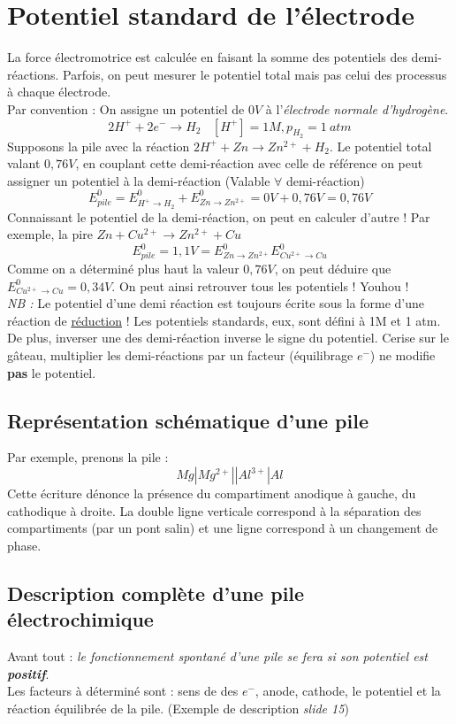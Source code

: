 \documentclass[british,french,11pt, a4paper, openany]{book}
\begin{document}
\section{Potentiel standard de l'électrode}
La force électromotrice est calculée en faisant la somme des potentiels des demi-réactions. Parfois, on peut mesurer le potentiel total mais pas celui des processus à chaque électrode.\\
Par convention  : On assigne un potentiel de $0 V$ à l'\textit{électrode normale d'hydrogène}.
$$2H^+ + 2e^- \rightarrow H_2\ \ \ \ [H^+] = 1M, p_{H_2} = 1\ atm$$
Supposons la pile avec la réaction $2H^+ + Zn \rightarrow Zn^{2+} + H_2$. Le potentiel total valant $0,76V$, en couplant cette demi-réaction avec celle de référence on peut assigner un potentiel à la demi-réaction (Valable $\forall$ demi-réaction)
$$E^0_{pile} = E^0_{H^+ \rightarrow H_2} + E^0_{Zn \rightarrow Zn^{2+}} = 0V + 0,76V = 0,76V$$
Connaissant le potentiel de la demi-réaction, on peut en calculer d'autre ! Par exemple, la pire $Zn + Cu^{2+} \rightarrow Zn^{2+} + Cu$
$$E^0_{pile} = 1,1V = E^0_{Zn \rightarrow Zn^{2+}}  E^0_{Cu^{2+} \rightarrow Cu}$$
Comme on a déterminé plus haut la valeur $0,76V$, on peut déduire que $E^0_{Cu^{2+} \rightarrow Cu} = 0,34V$. On peut ainsi retrouver tous les potentiels ! Youhou !\\

\textit{NB :} Le potentiel d'une demi réaction est toujours écrite sous la forme d'une réaction de \underline{réduction} ! Les potentiels standards, eux, sont défini à 1M et 1 atm. \\

De plus, inverser une des demi-réaction inverse le signe du potentiel. Cerise sur le gâteau, multiplier les demi-réactions par un facteur (équilibrage $e^-$) ne modifie \textbf{pas} le potentiel.

\subsection{Représentation schématique d'une pile}
Par exemple, prenons la pile :
$$Mg | Mg^{2+} || Al^{3+} | Al$$
Cette écriture dénonce la présence du compartiment anodique à gauche, du cathodique à droite. La double ligne verticale correspond à la séparation des compartiments (par un pont salin) et une ligne correspond à un changement de phase.

\subsection{Description complète d'une pile électrochimique}
Avant tout : \textit{le fonctionnement spontané d'une pile se fera si son potentiel est \textbf{positif}}.\\
Les facteurs à déterminé sont : sens de des $e^-$, anode, cathode, le potentiel et la réaction équilibrée de la pile. (Exemple de description \textit{slide 15})
\end{document}
